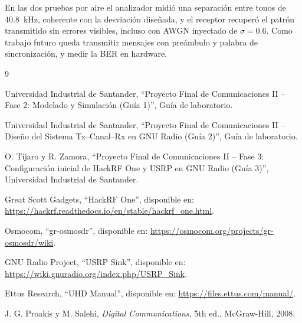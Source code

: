 \documentclass[conference]{IEEEtran}
\begin{document}
En las dos pruebas por aire el analizador midió una separación entre tonos de 40.8~kHz, coherente con la desviación diseñada, y el receptor recuperó el patrón transmitido sin errores visibles, incluso con AWGN inyectado de $\sigma = 0.6$. Como trabajo futuro queda transmitir mensajes con preámbulo y palabra de sincronización, y medir la BER en hardware.

\begin{thebibliography}{9}

 Universidad Industrial de Santander, ``Proyecto Final de Comunicaciones II -- Fase 2: Modelado y Simulación (Guía 1)'', Guía de laboratorio.

 Universidad Industrial de Santander, ``Proyecto Final de Comunicaciones II -- Diseño del Sistema Tx--Canal--Rx en GNU Radio (Guía 2)'', Guía de laboratorio.

 O. Tíjaro y R. Zamora, ``Proyecto Final de Comunicaciones II -- Fase 3: Configuración inicial de HackRF One y USRP en GNU Radio (Guía 3)'', Universidad Industrial de Santander.

 Great Scott Gadgets, ``HackRF One'', disponible en: \url{https://hackrf.readthedocs.io/en/stable/hackrf_one.html}.

 Osmocom, ``gr-osmosdr'', disponible en: \url{https://osmocom.org/projects/gr-osmosdr/wiki}.

 GNU Radio Project, ``USRP Sink'', disponible en: \url{https://wiki.gnuradio.org/index.php/USRP_Sink}.

 Ettus Research, ``UHD Manual'', disponible en: \url{https://files.ettus.com/manual/}.

 J. G. Proakis y M. Salehi, \textit{Digital Communications}, 5th ed., McGraw-Hill, 2008.

\end{thebibliography}
\end{document}
